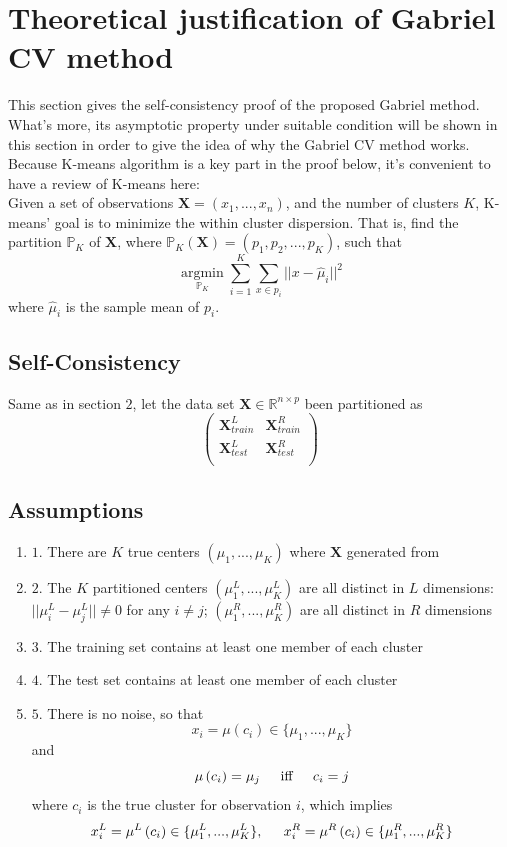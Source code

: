 \documentclass[11pt]{article}
\newcommand{\R}{\mathbb{R}}
\begin{document}
\section{Theoretical justification of Gabriel CV method}

This section gives the self-consistency proof of the proposed Gabriel method. What's more, its asymptotic property under suitable condition will be shown in this section in order to give the idea of why the Gabriel CV method works.\\

Because K-means algorithm is a key part in the proof below, it's convenient to have a review of K-means here:\\
Given a set of observations $\mathbf{X} = (x_1,...,x_n)$, and the number of clusters $K$, K-means' goal is to minimize the within cluster dispersion. That is, find the partition $\mathbb{P}_K$ of $\mathbf{X}$, where $\mathbb{P}_K(\mathbf{X})= (p_1,p_2,...,p_K)$, such that
\[	\underset{\mathbb{P}_K}{\operatorname{argmin}} \sum^K_{i=1}\sum_{x \in p_i } ||x-\hat{\mu}_i||^2\]
where $\hat{\mu}_i$ is the sample mean of $p_i$.
\subsection{Self-Consistency}
Same as in section $2$, let the data set $\mathbf{X} \in \R^{n \times p}$ been partitioned as
 \[ 
 \begin{pmatrix}
\mathbf{X}^L_{train} & \mathbf{X}^R_{train}\\
  \mathbf{X}^L_{test}  & \mathbf{X}^R_{test}\\
  \end{pmatrix}
 \]
\subsection*{Assumptions}
\begin{enumerate}[label={Assumption},leftmargin=*]
\item $1.$ There are $K$ true centers $(\mu_1,...,\mu_K)$ where $\mathbf{X}$ generated from
\item $2.$ The $K$ partitioned centers $(\mu^L_1,...,\mu^L_K)$ are all distinct in $L$ dimensions: $||\mu^L_i-\mu^L_j|| \neq 0$ for any $i \neq j$; $(\mu^R_1,...,\mu^R_K)$ are all distinct in $R$ dimensions
\item $3.$ The training set contains at least one member of each cluster
\item $4.$ The test set contains at least one member of each cluster
\item $5.$ There is no noise, so that $$x_i = \mu \left(c_i\right) \in \{\mu_1,...,\mu_K\} $$ and $$\mu \left(c_i\right) = \mu_j \hspace{0.2in} \text{iff} \hspace{0.2in} c_i = j$$ where $c_i$ is the true cluster for observation $i$, which implies $$x^L_i = \mu^L\left(c_i\right) \in \{\mu^L_1,...,\mu^L_K\},\hspace{0.2in} x^R_i = \mu^R\left(c_i\right) \in \{\mu^R_1,...,\mu^R_K\}$$
\end{enumerate}
 
\end{document}
